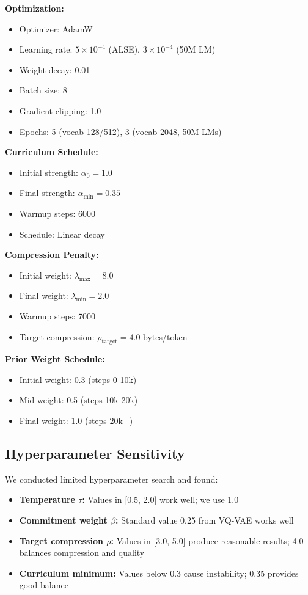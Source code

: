\documentclass{article}
\begin{document}
\textbf{Optimization:}
\begin{itemize}
    \item Optimizer: AdamW
    \item Learning rate: $5 \times 10^{-4}$ (ALSE), $3 \times 10^{-4}$ (50M LM)
    \item Weight decay: 0.01
    \item Batch size: 8
    \item Gradient clipping: 1.0
    \item Epochs: 5 (vocab 128/512), 3 (vocab 2048, 50M LMs)
\end{itemize}

\textbf{Curriculum Schedule:}
\begin{itemize}
    \item Initial strength: $\alpha_0 = 1.0$
    \item Final strength: $\alpha_{\min} = 0.35$
    \item Warmup steps: 6000
    \item Schedule: Linear decay
\end{itemize}

\textbf{Compression Penalty:}
\begin{itemize}
    \item Initial weight: $\lambda_{\max} = 8.0$
    \item Final weight: $\lambda_{\min} = 2.0$
    \item Warmup steps: 7000
    \item Target compression: $\rho_{\text{target}} = 4.0$ bytes/token
\end{itemize}

\textbf{Prior Weight Schedule:}
\begin{itemize}
    \item Initial weight: 0.3 (steps 0-10k)
    \item Mid weight: 0.5 (steps 10k-20k)
    \item Final weight: 1.0 (steps 20k+)
\end{itemize}

\subsection{Hyperparameter Sensitivity}

We conducted limited hyperparameter search and found:

\begin{itemize}
    \item \textbf{Temperature $\tau$:} Values in [0.5, 2.0] work well; we use 1.0
    \item \textbf{Commitment weight $\beta$:} Standard value 0.25 from VQ-VAE works well
    \item \textbf{Target compression $\rho$:} Values in [3.0, 5.0] produce reasonable results; 4.0 balances compression and quality
    \item \textbf{Curriculum minimum:} Values below 0.3 cause instability; 0.35 provides good balance
\end{itemize}
\end{document}
